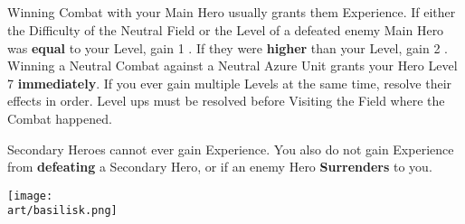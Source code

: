 \begin{multicols*}{2}
\subsection*{}

Winning Combat with your Main Hero usually grants them Experience.
If either the Difficulty of the Neutral Field or the Level of a defeated enemy Main Hero was \textbf{equal} to your Level, gain 1 .
If they were \textbf{higher} than your Level, gain 2 .
Winning a Neutral Combat against a Neutral Azure  Unit grants your Hero Level 7 \textbf{immediately}.
If you ever gain multiple Levels at the same time, resolve their effects in order.
Level ups must be resolved before Visiting the Field where the Combat happened.\par
Secondary Heroes cannot ever gain Experience.
You also do not gain Experience from \textbf{defeating} a Secondary Hero, or if an enemy Hero \textbf{Surrenders} to you.

\vspace*{\fill}
\begin{center}
  \texttt{[image: \\art/basilisk.png]}
\end{center}
\end{multicols*}

\clearpage


